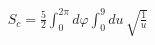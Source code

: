 \documentclass[preview]{standalone}
\begin{document}
\begin{align*}
S_c = \frac{5}{2} \int_0^{2\pi} d\varphi \int_0^9 du\, \sqrt{\frac{1}{u}}
\end{align*}
\end{document}
